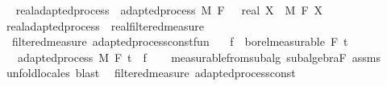 \begin{isabellebody}
\isadelimproof
\ %
\endisadelimproof
%
\isatagproof
\isacommand{{\isachardot}{\kern0pt}{\isachardot}{\kern0pt}}\isamarkupfalse%
%
\endisatagproof
{\isafoldproof}%
%
\isadelimproof
%
\endisadelimproof
\isanewline
\isanewline
{}\isamarkupfalse%
\ real{\isacharunderscore}{\kern0pt}adapted{\isacharunderscore}{\kern0pt}process\ {\isacharequal}{\kern0pt}\ adapted{\isacharunderscore}{\kern0pt}process\ M\ F\ {\isachardoublequoteopen}{}\ {\isacharcolon}{\kern0pt}{\isacharcolon}{\kern0pt}\ real{\isachardoublequoteclose}\ X\ \ M\ F\ X\isanewline
{}\isamarkupfalse%
\ real{\isacharunderscore}{\kern0pt}adapted{\isacharunderscore}{\kern0pt}process\ {\isasymsubseteq}\ real{\isacharunderscore}{\kern0pt}filtered{\isacharunderscore}{\kern0pt}measure%
\isadelimproof
\ %
\endisadelimproof
%
\isatagproof
\isacommand{{\isachardot}{\kern0pt}{\isachardot}{\kern0pt}}\isamarkupfalse%
%
\endisatagproof
{\isafoldproof}%
%
\isadelimproof
%
\endisadelimproof
\isanewline
\isanewline
{}\isamarkupfalse%
\ {\isacharparenleft}{\kern0pt}\ filtered{\isacharunderscore}{\kern0pt}measure{\isacharparenright}{\kern0pt}\ adapted{\isacharunderscore}{\kern0pt}process{\isacharunderscore}{\kern0pt}const{\isacharunderscore}{\kern0pt}fun{\isacharcolon}{\kern0pt}\isanewline
\ \ \ {\isachardoublequoteopen}f\ {\isasymin}\ borel{\isacharunderscore}{\kern0pt}measurable\ {\isacharparenleft}{\kern0pt}F\ t\isanewline
\ \ \ {\isachardoublequoteopen}adapted{\isacharunderscore}{\kern0pt}process\ M\ F\ t\ {\isacharparenleft}{\kern0pt}{\isasymlambda}{\isacharunderscore}{\kern0pt}{\isachardot}{\kern0pt}\ f{\isacharparenright}{\kern0pt}{\isachardoublequoteclose}\isanewline
%
\isadelimproof
\ \ %
\endisadelimproof
%
\isatagproof
{}\isamarkupfalse%
\ measurable{\isacharunderscore}{\kern0pt}from{\isacharunderscore}{\kern0pt}subalg\ subalgebra{\isacharunderscore}{\kern0pt}F\ assms\ \isamarkupfalse%
\ {\isacharparenleft}{\kern0pt}unfold{\isacharunderscore}{\kern0pt}locales{\isacharparenright}{\kern0pt}\ blast%
\endisatagproof
{\isafoldproof}%
%
\isadelimproof
\isanewline
%
\endisadelimproof
\isanewline
{}\isamarkupfalse%
\ {\isacharparenleft}{\kern0pt}\ filtered{\isacharunderscore}{\kern0pt}measure{\isacharparenright}{\kern0pt}\ adapted{\isacharunderscore}{\kern0pt}process{\isacharunderscore}{\kern0pt}const{\isacharcolon}{\kern0pt}\isanewline

\end{isabellebody}
